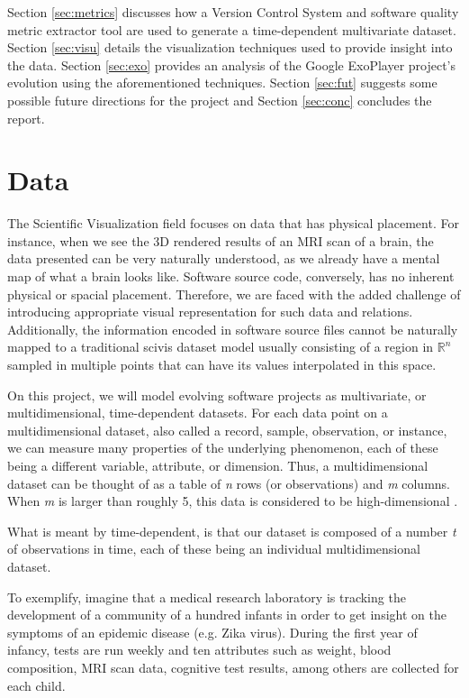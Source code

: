 Section \ref{sec:metrics} discusses how a Version Control System and software quality metric extractor tool are used to generate a time-dependent multivariate dataset. Section \ref{sec:visu} details the visualization techniques used to provide insight into the data. Section \ref{sec:exo} provides an analysis of the Google ExoPlayer project's evolution using the aforementioned techniques. Section \ref{sec:fut} suggests some possible future directions for the project and Section \ref{sec:conc} concludes the report.

\section{Data}
The Scientific Visualization field focuses on data that has physical placement. For instance, when we see the 3D rendered results of an MRI scan of a brain, the data presented can be very naturally understood, as we already have a mental map of what a brain looks like. Software source code, conversely, has no inherent physical or spacial placement. Therefore, we are faced with the added challenge of introducing appropriate visual representation for such data and relations. Additionally, the information encoded in software source files cannot be naturally mapped to a traditional scivis dataset model usually consisting of a region in $\mathbb{R}^{n}$ sampled in multiple points that can have its values interpolated in this space.

On this project, we will model evolving software projects as multivariate, or multidimensional, time-dependent datasets. For each data point on a multidimensional dataset, also called a record, sample, observation, or instance, we can measure many properties of the underlying phenomenon, each of these being a different variable, attribute, or dimension. Thus, a multidimensional dataset can be thought of as a table of \textit{n} rows (or observations) and \textit{m} columns. When \textit{m} is larger than roughly 5, this data is considered to be high-dimensional .

What is meant by time-dependent, is that our dataset is composed of a number \textit{t} of observations in time, each of these being an individual multidimensional dataset.

To exemplify, imagine that a medical research laboratory is tracking the development of a community of a hundred infants in order to get insight on the symptoms of an epidemic disease (e.g. Zika virus). During the first year of infancy, tests are run weekly and ten attributes such as weight, blood composition, MRI scan data, cognitive test results, among others are collected for each child.


